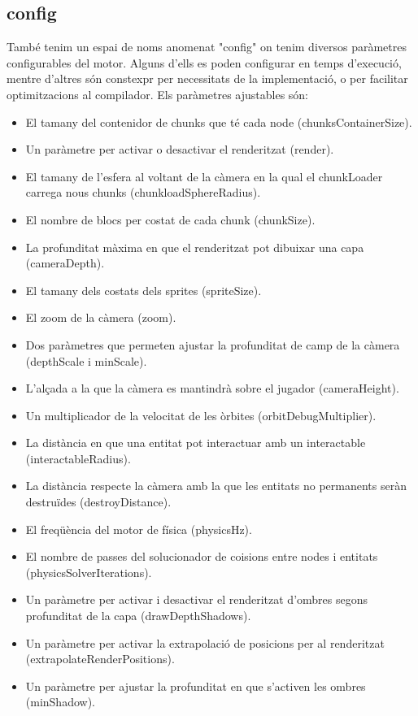 \subsection{config}
També tenim un espai de noms anomenat "config" on tenim diversos paràmetres configurables del motor. Alguns d'ells es poden configurar en temps d'execució, mentre d'altres són constexpr per necessitats de la implementació, o per facilitar optimitzacions al compilador.
Els paràmetres ajustables són:
\begin{itemize}
  \item El tamany del contenidor de chunks que té cada node (chunksContainerSize).
  \item Un paràmetre per activar o desactivar el renderitzat (render).
  \item El tamany de l'esfera al voltant de la càmera en la qual el chunkLoader carrega nous chunks (chunkloadSphereRadius).
  \item El nombre de blocs per costat de cada chunk (chunkSize).
  \item La profunditat màxima en que el renderitzat pot dibuixar una capa (cameraDepth).
  \item El tamany dels costats dels sprites (spriteSize).
  \item El zoom de la càmera (zoom).
  \item Dos paràmetres que permeten ajustar la profunditat de camp de la càmera (depthScale i minScale).
  \item L'alçada a la que la càmera es mantindrà sobre el jugador (cameraHeight).
  \item Un multiplicador de la velocitat de les òrbites (orbitDebugMultiplier).
  \item La distància en que una entitat pot interactuar amb un interactable (interactableRadius).
  \item La distància respecte la càmera amb la que les entitats no permanents seràn destruïdes (destroyDistance).
  \item El freqüència del motor de física (physicsHz).
  \item El nombre de passes del solucionador de co\lgem isions entre nodes i entitats (physicsSolverIterations).
  \item Un paràmetre per activar i desactivar el renderitzat d'ombres segons profunditat de la capa (drawDepthShadows).
  \item Un paràmetre per activar la extrapolació de posicions per al renderitzat (extrapolateRenderPositions).
  \item Un paràmetre per ajustar la profunditat en que s'activen les ombres (minShadow).

\end{itemize}
